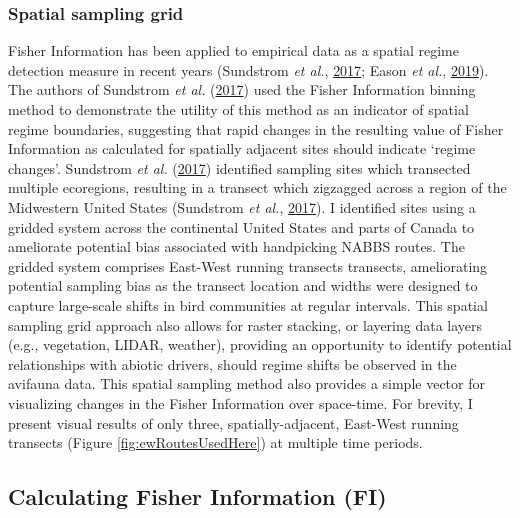 \documentclass[12pt,twoside,openany]{reedthesis}
\begin{document}
\hypertarget{spatial-sampling-grid}{%
\subsubsection{Spatial sampling grid}\label{spatial-sampling-grid}}

Fisher Information has been applied to empirical data as a spatial regime detection measure in recent years (Sundstrom \emph{et al.}, \protect\hyperlink{ref-sundstrom2017detecting}{2017}; Eason \emph{et al.}, \protect\hyperlink{ref-eason2019information}{2019}). The authors of Sundstrom \emph{et al.} (\protect\hyperlink{ref-sundstrom2017detecting}{2017}) used the Fisher Information binning method to demonstrate the utility of this method as an indicator of spatial regime boundaries, suggesting that rapid changes in the resulting value of Fisher Information as calculated for spatially adjacent sites should indicate `regime changes'. Sundstrom \emph{et al.} (\protect\hyperlink{ref-sundstrom2017detecting}{2017}) identified sampling sites which transected multiple ecoregions, resulting in a transect which zigzagged across a region of the Midwestern United States (Sundstrom \emph{et al.}, \protect\hyperlink{ref-sundstrom2017detecting}{2017}). I identified sites using a gridded system across the continental United States and parts of Canada to ameliorate potential bias associated with handpicking NABBS routes. The gridded system comprises East-West running transects transects, ameliorating potential sampling bias as the transect location and widths were designed to capture large-scale shifts in bird communities at regular intervals. This spatial sampling grid approach also allows for raster stacking, or layering data layers (e.g., vegetation, LIDAR, weather), providing an opportunity to identify potential relationships with abiotic drivers, should regime shifts be observed in the avifauna data. This spatial sampling method also provides a simple vector for visualizing changes in the Fisher Information over space-time. For brevity, I present visual results of only three, spatially-adjacent, East-West running transects (Figure \ref{fig:ewRoutesUsedHere}) at multiple time periods.

\hypertarget{calculating-fisher-information-fi}{%
\subsection{Calculating Fisher Information (FI)}\label{calculating-fisher-information-fi}}
\end{document}
